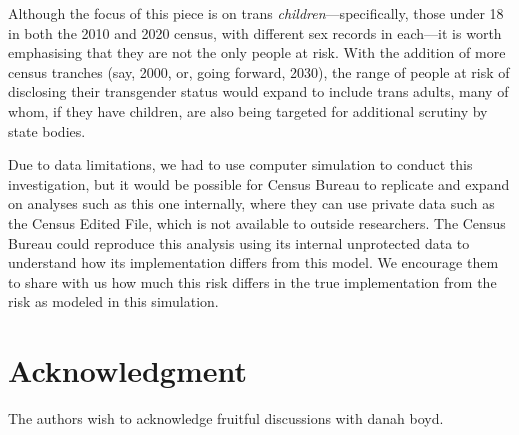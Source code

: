 \documentclass{jpc} %
\theoremstyle{plain}\newtheorem{satz}[thm]{Satz} %
\begin{document}
Although the focus of this piece is on trans \textit{children}---specifically, those under 18 in both the 2010 and 2020 census, with different sex records in each---it is worth emphasising that they are not the only people at risk. With the addition of more census tranches (say, 2000, or, going forward, 2030), the range of people at risk of disclosing their transgender status would expand to include trans adults, many of whom, if they have children, are also being targeted for additional scrutiny by state bodies.

Due to data limitations, we had to use computer simulation to conduct this investigation, but it would be possible for Census Bureau to replicate and expand on analyses such as this one internally, where they can use private data such as the Census Edited File, which is not available to outside researchers.  The Census Bureau could reproduce this analysis using its internal unprotected data to understand how its implementation differs from this model. We encourage them to share with us how much this risk differs in the true implementation from the risk as modeled in this simulation.

 
\section*{Acknowledgment}
  \noindent The authors wish to acknowledge fruitful discussions with danah boyd.




\end{document}
